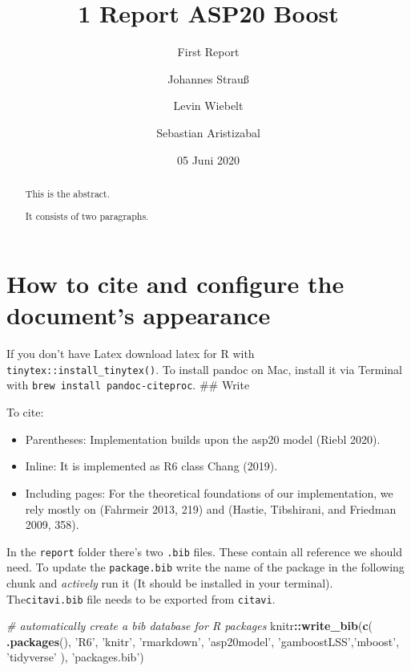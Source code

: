 \documentclass[
]{report}
\title{1 Report ASP20 Boost}
\subtitle{First Report}
\author{Johannes Strauß \and Levin Wiebelt \and Sebastian Aristizabal}
\date{05 Juni 2020}
\newenvironment{Shaded}{\begin{snugshade}}{\end{snugshade}}
\newcommand{\CommentTok}[1]{\textcolor[rgb]{0.56,0.35,0.01}{\textit{#1}}}
\newcommand{\KeywordTok}[1]{\textcolor[rgb]{0.13,0.29,0.53}{\textbf{#1}}}
\newcommand{\NormalTok}[1]{#1}
\newcommand{\OperatorTok}[1]{\textcolor[rgb]{0.81,0.36,0.00}{\textbf{#1}}}
\newcommand{\StringTok}[1]{\textcolor[rgb]{0.31,0.60,0.02}{#1}}
\providecommand{\tightlist}{%
  \setlength{\itemsep}{0pt}\setlength{\parskip}{0pt}}
\begin{document}
\maketitle
\begin{abstract}
This is the abstract.

It consists of two paragraphs.
\end{abstract}

{
\setcounter{tocdepth}{1}
\tableofcontents
}
\hypertarget{how-to-cite-and-configure-the-documents-appearance}{%
\chapter{How to cite and configure the document's
appearance}\label{how-to-cite-and-configure-the-documents-appearance}}

If you don't have Latex download latex for R with
\texttt{tinytex::install\_tinytex()}. To install pandoc on Mac, install
it via Terminal with \texttt{brew\ install\ pandoc-citeproc}. \#\# Write

To cite:

\begin{itemize}
\tightlist
\item
  Parentheses: Implementation builds upon the asp20 model (Riebl 2020).
\item
  Inline: It is implemented as R6 class Chang (2019).
\item
  Including pages: For the theoretical foundations of our
  implementation, we rely mostly on (Fahrmeir 2013, 219) and (Hastie,
  Tibshirani, and Friedman 2009, 358).
\end{itemize}

In the \texttt{report} folder there's two \texttt{.bib} files. These
contain all reference we should need. To update the \texttt{package.bib}
write the name of the package in the following chunk and \emph{actively}
run it (It should be installed in your terminal). The\texttt{citavi.bib}
file needs to be exported from \texttt{citavi}.

\begin{Shaded}
\begin{Highlighting}[]
\CommentTok{# automatically create a bib database for R packages}
\NormalTok{knitr}\OperatorTok{::}\KeywordTok{write_bib}\NormalTok{(}\KeywordTok{c}\NormalTok{(}
  \KeywordTok{.packages}\NormalTok{(), }\StringTok{'R6'}\NormalTok{, }\StringTok{'knitr'}\NormalTok{, }\StringTok{'rmarkdown'}\NormalTok{, }\StringTok{'asp20model'}\NormalTok{, }\StringTok{'gamboostLSS'}\NormalTok{,}\StringTok{'mboost'}\NormalTok{, }\StringTok{'tidyverse'}  
\NormalTok{), }\StringTok{'packages.bib'}\NormalTok{)}
\end{Highlighting}
\end{Shaded}
\end{document}

